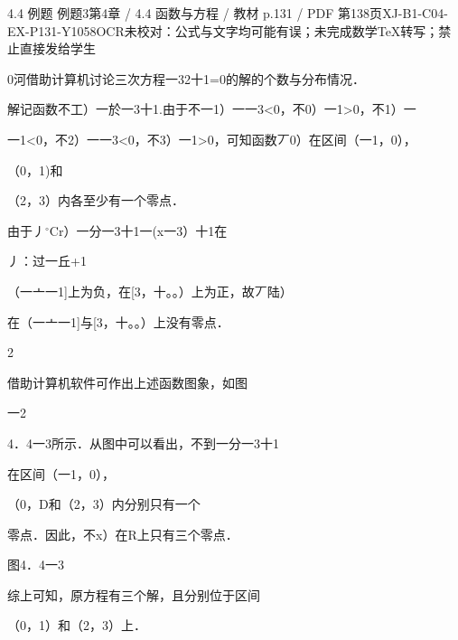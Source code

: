 \begin{bankitem}{4.4 例题 例题3}{第4章 / 4.4 函数与方程 / 教材 p.131 / PDF 第138页}{XJ-B1-C04-EX-P131-Y1058}{OCR未校对：公式与文字均可能有误；未完成数学TeX转写；禁止直接发给学生}
\begin{ocrdraft}
\par
0河借助计算机讨论三次方程一32十1=0的解的个数与分布情况．
\par
解记函数不工）一於一3十1.由于不一1）一一3<0，不0）一1>0，不1）一
\par
一1<0，不2）一一3<0，不3）一1>0，可知函数丆0）在区间（一1，0），
\par
（0，1)和
\par
（2，3）内各至少有一个零点．
\par
由于丿\ensuremath{{}^\circ\mathrm C}r）一分一3十1一(x一3）十1在
\par
丿：过一丘+1
\par
（一亠一1]上为负，在[3，十。。）上为正，故丆陆）
\par
在（一亠一1]与[3，十。。）上没有零点．
\par
2
\par
借助计算机软件可作出上述函数图象，如图
\par
一2
\par
4．4一3所示．从图中可以看出，不到一分一3十1
\par
在区间（一1，0），
\par
（0，D和（2，3）内分别只有一个
\par
零点．因此，不x）在R上只有三个零点．
\par
图4．4一3
\par
综上可知，原方程有三个解，且分别位于区间
\par
（0，1）和（2，3）上．
\end{ocrdraft}
\end{bankitem}
